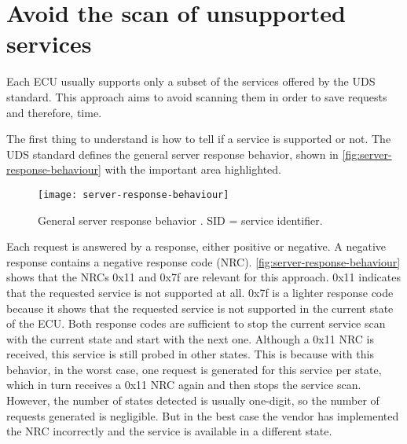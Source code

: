 \section{Avoid the scan of unsupported services}
\label{subsec:unsupported-services-elaboration}

Each ECU usually supports only a subset of the services offered by the UDS standard. This approach aims to avoid scanning them in order to save requests and therefore, time.

The first thing to understand is how to tell if a service is supported or not. The UDS standard defines the general server response behavior, shown in \autoref{fig:server-response-behaviour} with the important area highlighted.

\begin{figure}[htb]
    \centering
    \texttt{[image: server-response-behaviour]}
    \caption{General server response behavior \cite{iso14229}. SID = service identifier.}
    \label{fig:server-response-behaviour}
\end{figure}

Each request is answered by a response, either positive or negative. A negative response contains a negative response code (NRC). \autoref{fig:server-response-behaviour} shows that the NRCs 0x11 and 0x7f are relevant for this approach. 0x11 indicates that the requested service is not supported at all. 0x7f is a lighter response code because it shows that the requested service is not supported in the current state of the ECU. Both response codes are sufficient to stop the current service scan with the current state and start with the next one. Although a 0x11 NRC is received, this service is still probed in other states. This is because with this behavior, in the worst case, one request is generated for this service per state, which in turn receives a 0x11 NRC again and then stops the service scan. However, the number of states detected is usually one-digit, so the number of requests generated is negligible. But in the best case the vendor has implemented the NRC incorrectly and the service is available in a different state.
